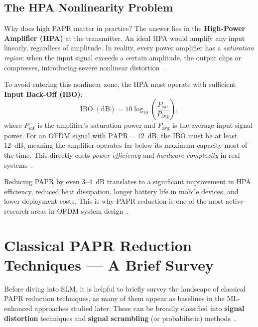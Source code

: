 \subsection{The HPA Nonlinearity Problem}

Why does high PAPR matter in practice?  The answer lies in the
\textbf{High-Power Amplifier (HPA)} at the transmitter.
An ideal HPA would amplify any input linearly, regardless of amplitude.
In reality, every power amplifier has a \emph{saturation region}:
when the input signal exceeds a certain amplitude, the output clips
or compresses, introducing severe nonlinear distortion~\cite{da2024survey}.

To avoid entering this nonlinear zone, the HPA must operate with sufficient
\textbf{Input Back-Off (IBO)}:
\begin{equation}
    \mathrm{IBO\;(dB)} = 10\log_{10}\!\left(\frac{P_{\mathrm{sat}}}{P_{\mathrm{avg}}}\right),
    \label{eq:ibo}
\end{equation}
where $P_{\mathrm{sat}}$ is the amplifier's saturation power and
$P_{\mathrm{avg}}$ is the average input signal power.  For an OFDM signal
with $\mathrm{PAPR} = 12$~dB, the IBO must be at least 12~dB, meaning
the amplifier operates far below its maximum capacity most of the time.
This directly costs \emph{power efficiency} and \emph{hardware complexity}
in real systems~\cite{da2024survey}.

\begin{keyinsight}
    Reducing PAPR by even 3--4~dB translates to a significant improvement
    in HPA efficiency, reduced heat dissipation, longer battery life in
    mobile devices, and lower deployment costs.  This is why PAPR reduction
    is one of the most active research areas in OFDM system
    design~\cite{da2024survey}.
\end{keyinsight}


\section{Classical PAPR Reduction Techniques --- A Brief Survey}
\label{sec:classical_techniques}

Before diving into SLM, it is helpful to briefly survey the landscape of
classical PAPR reduction techniques, as many of them appear as baselines
in the ML-enhanced approaches studied later.  These can be broadly
classified into \textbf{signal distortion} techniques and
\textbf{signal scrambling} (or probabilistic) methods~\cite{da2024survey}.


